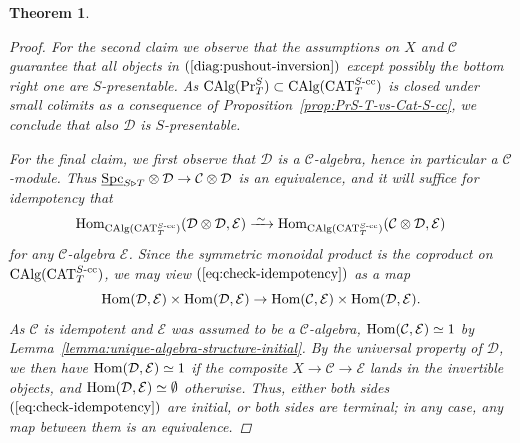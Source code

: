 \documentclass[reqno]{memo-l}
\theoremstyle{mythm}
\newtheorem{thm}{Theorem}[section]
\theoremstyle{definition}
\numberwithin{equation}{section}
\newcommand{\Cc}{{\mathcal{C}}}
\newcommand{\Dd}{{\mathcal{D}}}
\newcommand{\Ee}{{\mathcal{E}}}
\DeclareMathOperator{\Spc}{Spc}
\DeclareMathOperator{\CAT}{CAT}
\renewcommand{\hom}{\textup{hom}}
\renewcommand{\hom}{{\textup{Hom}}}
\DeclareMathOperator{\CAlg}{\textup{CAlg}}
\renewcommand{\Pr}{\textup{Pr}}
\newcommand{\ulhelper}[2]{\underline{\setbox0=\hbox{$#1#2$}\dp0=0.4pt \box0\relax}}
\newcommand{\ul}[1]{{\mathpalette\ulhelper{#1}}\hbox{\rule[-2pt]{0pt}{0pt}}}
\newcommand{\iso}{\xrightarrow{\;\smash{\raisebox{-0.25ex}{\ensuremath{\scriptstyle\sim}}}\;}}
\begin{document}
\begin{thm}
\begin{proof}
        For the second claim we observe that the assumptions on $X$ and $\Cc$ guarantee that all objects in $(\ref{diag:pushout-inversion})$ except possibly the bottom right one are $S$-presentable. As $\CAlg(\Pr^S_T)\subset\CAlg(\CAT_T^\textup{$S$-cc})$ is closed under small colimits as a consequence of Proposition~\ref{prop:PrS-T-vs-Cat-S-cc}, we conclude that also $\Dd$ is $S$-presentable.

        For the final claim, we first observe that $\Dd$ is a $\Cc$-algebra, hence in particular a $\Cc$-module. Thus $\ul\Spc_{S\triangleright T}\otimes\Dd\to\Cc\otimes\Dd$ is an equivalence, and it will suffice for idempotency that 
        \begin{equation}\label{eq:check-idempotency}
            \hom_{\CAlg(\CAT_T^\textup{$S$-cc})}(\Dd\otimes\Dd,\Ee)\iso\hom_{\CAlg(\CAT_T^\textup{$S$-cc})}(\Cc\otimes\Dd,\Ee)
        \end{equation}
        for any $\Cc$-algebra $\Ee$. Since the symmetric monoidal product is the coproduct on $\CAlg(\CAT_T^\textup{$S$-cc})$, we may view $(\ref{eq:check-idempotency})$ as a map
        \[
            \hom(\Dd,\Ee)\times\hom(\Dd,\Ee)\to\hom(\Cc,\Ee)\times\hom(\Dd,\Ee).
        \]
        As $\Cc$ is idempotent and $\Ee$ was assumed to be a $\Cc$-algebra, $\hom(\Cc,\Ee)\simeq1$ by Lemma~\ref{lemma:unique-algebra-structure-initial}. By the universal property of $\Dd$, we then have $\hom(\Dd,\Ee)\simeq1$ if the composite $X\to\Cc\to\Ee$ lands in the invertible objects, and $\hom(\Dd,\Ee)\simeq\emptyset$ otherwise. Thus, either both sides $(\ref{eq:check-idempotency})$ are initial, or both sides are terminal; in any case, any map between them is an equivalence.


\end{proof}
\end{thm}
\end{document}
